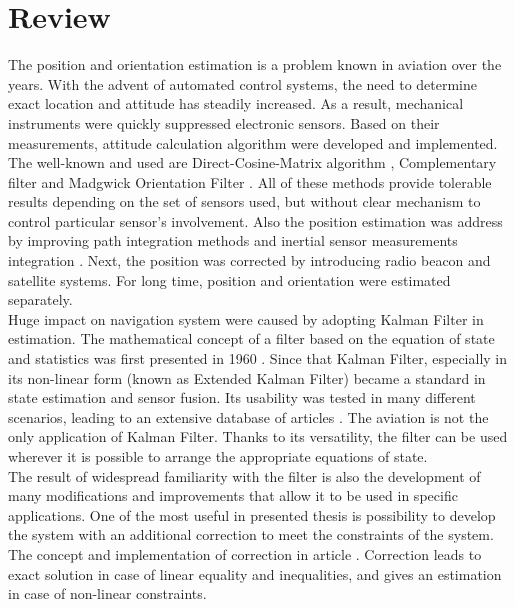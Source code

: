 \section{Review}

The position and orientation estimation is a problem known in aviation over the years. With the advent of automated control systems, the need to determine exact location and attitude has steadily increased. As a result, mechanical instruments were quickly suppressed electronic sensors. Based on their measurements, attitude calculation algorithm were developed and implemented. The well-known and used are Direct-Cosine-Matrix algorithm \cite{dcm}, Complementary filter \cite{complementary} and Madgwick Orientation Filter \cite{madgwick} \cite{Hasan2020}. All of these methods provide tolerable results depending on the set of sensors used, but without clear mechanism to control particular sensor's involvement.
Also the position estimation was address by improving path integration methods and inertial sensor measurements integration \cite{farrell2012integrated}. Next, the position was corrected by introducing radio beacon and satellite systems. For long time, position and orientation were estimated separately.\\

Huge impact on navigation system were caused by adopting Kalman Filter in estimation. The mathematical concept of a filter based on the equation of state and statistics was first presented in 1960 \cite{kalman}. Since that Kalman Filter, especially in its non-linear form (known as Extended Kalman Filter) became a standard in state estimation and sensor fusion. Its usability was tested in many different scenarios, leading to an extensive database of articles \cite{ekf_poor} \cite{s16020264} \cite{s120709566}. The aviation is not the only application of Kalman Filter. Thanks to its versatility, the filter can be used wherever it is possible to arrange the appropriate equations of state.\\

The result of widespread familiarity with the filter is also the development of many modifications and improvements that allow it to be used in specific applications. One of the most useful in presented thesis is possibility to develop the system with an additional correction to meet the constraints of the system. The concept and implementation of correction in article \cite{simon}. Correction leads to exact solution in case of linear equality and inequalities, and gives an estimation in case of non-linear constraints.\\

